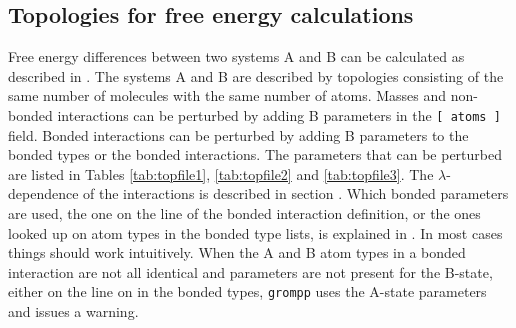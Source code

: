 \subsection{Topologies for free energy calculations}
Free energy differences between two systems A and B can be calculated as
described in .
The systems A and B are described by topologies
consisting of the same number of molecules with the same number of
atoms. Masses and non-bonded interactions can be perturbed by adding B
parameters in the {\tt [~atoms~]} field. Bonded interactions can be 
perturbed by adding B parameters to the bonded types or the bonded
interactions. The parameters that can be perturbed are listed in  
Tables \ref{tab:topfile1}, \ref{tab:topfile2} and \ref{tab:topfile3}.
The $\lambda$-dependence of the interactions is described
in section .
Which bonded parameters are used, the one on the line of the bonded
interaction definition, or the ones looked up on atom types
in the bonded type lists, is explained in .
In most cases things should work intuitively.
When the A and B atom types in a bonded interaction
are not all identical and parameters are not present for the B-state,
either on the line on in the bonded types,
{\tt grompp} uses the A-state parameters and issues a warning.

